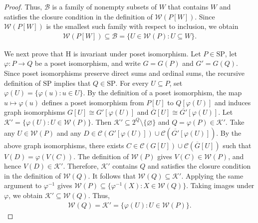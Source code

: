 \documentclass[11pt,a4paper]{article}
\begin{document}
\begin{proof}
Thus, $\mathcal B$ is a family of nonempty subsets of $W$
that contains $W$ and satisfies the closure condition in the definition of $\mathcal W(P[W])$.
Since $\mathcal W(P[W])$ is the smallest such family with respect to inclusion, we obtain
\begin{eqnarray*}
\mathcal W(P[W])\subseteq\mathcal B=\{U\in\mathcal W(P):U\subseteq W\}.
\end{eqnarray*}

We next prove that $\mathrm H$ is invariant under poset isomorphism.
Let $P\in\mathrm{SP}$, let $\varphi:P\to Q$ be a poset isomorphism,
and write $G=G(P)$ and $G'=G(Q)$.
Since poset isomorphisms preserve direct sums and ordinal sums,
the recursive definition of $\mathrm{SP}$ implies that $Q\in\mathrm{SP}$.
For every $U\subseteq P$, set $\varphi(U)=\{\varphi(u):u\in U\}$.
By the definition of a poset isomorphism,
the map $u\mapsto\varphi(u)$ defines a poset isomorphism from $P[U]$ to $Q[\varphi(U)]$
and induces graph isomorphisms $G[U]\cong G'[\varphi(U)]$ and
$\overline G[U]\cong\overline{G'}[\varphi(U)]$.
Let $\mathcal K'=\{\varphi(U):U\in\mathcal W(P)\}$.
Then $\mathcal K'\subseteq 2^Q\setminus\{\varnothing\}$ and $Q=\varphi(P)\in\mathcal K'$.
Take any $U\in\mathcal W(P)$ and any $D\in\mathcal C(G'[\varphi(U)])\cup\mathcal C(\overline{G'}[\varphi(U)])$.
By the above graph isomorphisms, there exists $C\in\mathcal C(G[U])\cup\mathcal C(\overline G[U])$
such that $V(D)=\varphi(V(C))$.
The definition of $\mathcal W(P)$ gives $V(C)\in\mathcal W(P)$, and hence $V(D)\in\mathcal K'$.
Therefore, $\mathcal K'$ contains $Q$ and satisfies the closure condition in the definition of $\mathcal W(Q)$.
It follows that $\mathcal W(Q)\subseteq\mathcal K'$.
Applying the same argument to $\varphi^{-1}$ gives $\mathcal W(P)\subseteq\{\varphi^{-1}(X):X\in\mathcal W(Q)\}$.
Taking images under $\varphi$, we obtain $\mathcal K'\subseteq\mathcal W(Q)$.
Thus,%
\begin{eqnarray*}
\mathcal W(Q)=\mathcal K'=\{\varphi(U):U\in\mathcal W(P)\}.
\end{eqnarray*}


\end{proof}
\end{document}
